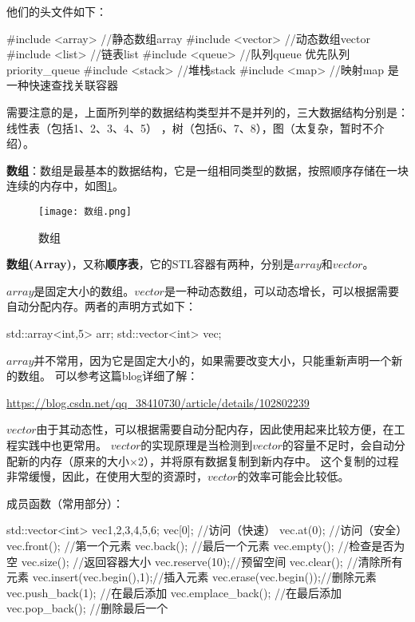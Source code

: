 他们的头文件如下：

\begin{tcode}
#include <array>    //静态数组array
#include <vector>   //动态数组vector
#include <list>     //链表list
#include <queue>    //队列queue 优先队列priority_queue
#include <stack>    //堆栈stack
#include <map>      //映射map 是一种快速查找关联容器
\end{tcode}

需要注意的是，上面所列举的数据结构类型并不是并列的，三大数据结构分别是：线性表（包括1、2、3、4、5）
，树（包括6、7、8），图（太复杂，暂时不介绍）。

\textbf{数组}：数组是最基本的数据结构，它是一组相同类型的数据，按照顺序存储在一块连续的内存中，如图\ref{fig:数组}。

\begin{figure}[H]
    \centering
    \texttt{[image: 数组.png]}
    \caption{数组} %
    \label{fig:数组} %
\end{figure}

\textbf{数组(Array)}，又称\textbf{顺序表}，它的STL容器有两种，分别是$array$和$vector$。

$array$是固定大小的数组。$vector$是一种动态数组，可以动态增长，可以根据需要自动分配内存。两者的声明方式如下：
\begin{tcode}
std::array<int,5> arr;
std::vector<int> vec;
\end{tcode}

$array$并不常用，因为它是固定大小的，如果需要改变大小，只能重新声明一个新的数组。
可以参考这篇blog详细了解：

\url{https://blog.csdn.net/qq_38410730/article/details/102802239}

$vector$由于其动态性，可以根据需要自动分配内存，因此使用起来比较方便，在工程实践中也更常用。
$vector$的实现原理是当检测到$vector$的容量不足时，会自动分配新的内存（原来的大小$\times$2），并将原有数据复制到新内存中。
这个复制的过程非常缓慢，因此，在使用大型的资源时，$vector$的效率可能会比较低。

成员函数（常用部分）：
\begin{tcode}
std::vector<int> vec{1,2,3,4,5,6};
vec[0];         //访问（快速）
vec.at(0);    //访问（安全）
vec.front();    //第一个元素
vec.back();     //最后一个元素
vec.empty();    //检查是否为空
vec.size();     //返回容器大小
vec.reserve(10);//预留空间
vec.clear();    //清除所有元素
vec.insert(vec.begin(),1);//插入元素
vec.erase(vec.begin());//删除元素
vec.push_back(1); //在最后添加
vec.emplace_back(); //在最后添加
vec.pop_back();     //删除最后一个
\end{tcode}

